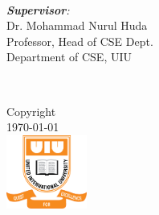 \documentclass[12pt]{report} %
\begin{document}
\begin{titlepage}
\begin{minipage}{0.5\textwidth}
\begin{flushleft}
\end{flushleft}
\end{minipage}
~
\begin{minipage}{0.4\textwidth}
\begin{flushright} \large
\emph{\textbf{Supervisor}:} \\
Dr. Mohammad Nurul Huda  \\%
Professor, Head of CSE Dept. \\
Department of CSE, UIU\\

\end{flushright}
\end{minipage}\\[3cm]



\ifx
\textregistered\textcopyright
\sffamily\textregistered\textcopyright
\fi

Copyright\\
\today\\[1cm]

\includegraphics[width=100px]{assets/uiu-logo.png}\\[1cm] %
 

\vfill %

\end{titlepage}
\end{document}
